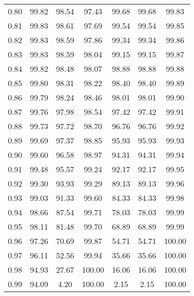 \begin{tabular}{|c|c|c|c|c|c|c|}
      0.80 &     99.82 &     98.54 &      97.43 &   99.68 &      99.68 &         99.83 \\
      0.81 &     99.83 &     98.61 &      97.69 &   99.54 &      99.54 &         99.85 \\
      0.82 &     99.83 &     98.59 &      97.86 &   99.34 &      99.34 &         99.86 \\
      0.83 &     99.83 &     98.59 &      98.04 &   99.15 &      99.15 &         99.87 \\
      0.84 &     99.82 &     98.48 &      98.07 &   98.88 &      98.88 &         99.88 \\
      0.85 &     99.80 &     98.31 &      98.22 &   98.40 &      98.40 &         99.89 \\
      0.86 &     99.79 &     98.24 &      98.46 &   98.01 &      98.01 &         99.90 \\
      0.87 &     99.76 &     97.98 &      98.54 &   97.42 &      97.42 &         99.91 \\
      0.88 &     99.73 &     97.72 &      98.70 &   96.76 &      96.76 &         99.92 \\
      0.89 &     99.69 &     97.37 &      98.85 &   95.93 &      95.93 &         99.93 \\
      0.90 &     99.60 &     96.58 &      98.97 &   94.31 &      94.31 &         99.94 \\
      0.91 &     99.48 &     95.57 &      99.24 &   92.17 &      92.17 &         99.95 \\
      0.92 &     99.30 &     93.93 &      99.29 &   89.13 &      89.13 &         99.96 \\
      0.93 &     99.03 &     91.33 &      99.60 &   84.33 &      84.33 &         99.98 \\
      0.94 &     98.66 &     87.54 &      99.71 &   78.03 &      78.03 &         99.99 \\
      0.95 &     98.11 &     81.48 &      99.70 &   68.89 &      68.89 &         99.99 \\
      0.96 &     97.26 &     70.69 &      99.87 &   54.71 &      54.71 &        100.00 \\
      0.97 &     96.11 &     52.56 &      99.94 &   35.66 &      35.66 &        100.00 \\
      0.98 &     94.93 &     27.67 &     100.00 &   16.06 &      16.06 &        100.00 \\
      0.99 &     94.09 &      4.20 &     100.00 &    2.15 &       2.15 &        100.00 \\
\bottomrule
\end{tabular}
